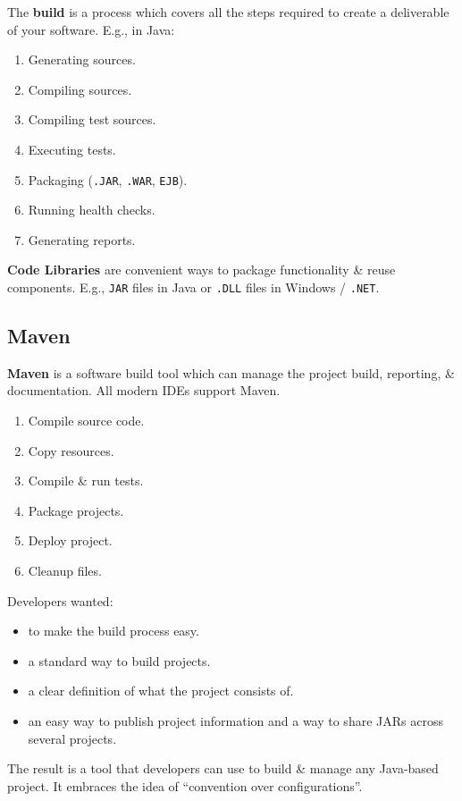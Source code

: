 \documentclass[a4paper,11pt]{article}
\begin{document}
The \textbf{build} is a process which covers all the steps required to create a deliverable of your software.
E.g., in Java:
\begin{enumerate}
    \item   Generating sources.
    \item   Compiling sources.
    \item   Compiling test sources.
    \item   Executing tests.
    \item   Packaging (\verb|.JAR|, \verb|.WAR|, \verb|EJB|).
    \item   Running health checks.
    \item   Generating reports.
\end{enumerate}

\textbf{Code Libraries} are convenient ways to package functionality \& reuse components.
E.g., \verb|JAR| files in Java or \verb|.DLL| files in Windows / \verb|.NET|.

\subsection{Maven}
\textbf{Maven} is a software build tool which can manage the project build, reporting, \& documentation.
All modern IDEs support Maven.
\begin{enumerate}
    \item   Compile source code.
    \item   Copy resources.
    \item   Compile \& run tests.
    \item   Package projects.
    \item   Deploy project.
    \item   Cleanup files.
\end{enumerate}

Developers wanted:
\begin{itemize}
    \item   to make the build process easy.
    \item   a standard way to build projects.
    \item   a clear definition of what the project consists of.
    \item   an easy way to publish project information and a way to share JARs across several projects.
\end{itemize}

The result is a tool that developers can use to build \& manage any Java-based project.
It embraces the idea of ``convention over configurations''.
\end{document}
